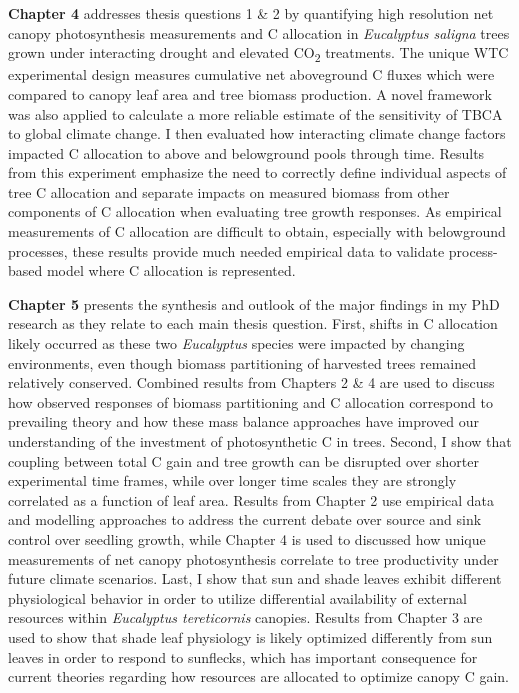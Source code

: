 \documentclass[a4paper]{article}\usepackage[]{graphicx}\usepackage[]{color}
\begin{document}
\textbf{Chapter 4} addresses thesis questions 1 \& 2 by quantifying high resolution net canopy photosynthesis measurements and C allocation in \textit{Eucalyptus saligna} trees grown under interacting drought and elevated CO\textsubscript{2} treatments. The unique WTC experimental design measures cumulative net aboveground C fluxes which were compared to canopy leaf area and tree biomass production. A novel framework was also applied to calculate a more reliable estimate of the sensitivity of TBCA to global climate change. I then evaluated how interacting climate change factors impacted C allocation to above and belowground pools through time. Results from this experiment emphasize the need to correctly define individual aspects of tree C allocation and separate impacts on measured biomass from other components of C allocation when evaluating tree growth responses. As empirical measurements of C allocation are difficult to obtain, especially with belowground processes, these results provide much needed empirical data to validate process-based model where C allocation is represented. 

\textbf{Chapter 5} presents the synthesis and outlook of the major findings in my PhD research as they relate to each main thesis question. First, shifts in C allocation likely occurred as these two \textit{Eucalyptus} species were impacted by changing environments, even though biomass partitioning of harvested trees remained relatively conserved. Combined results from Chapters 2 \& 4 are used to discuss how observed responses of biomass partitioning and C allocation correspond to prevailing theory and how these mass balance approaches have improved our understanding of the investment of photosynthetic C in trees. Second, I show that coupling between total C gain and tree growth can be disrupted over shorter experimental time frames, while over longer time scales they are strongly correlated as a function of leaf area. Results from Chapter 2 use empirical data and modelling approaches to address the current debate over source and sink control over seedling growth, while Chapter 4 is used to discussed how unique measurements of net canopy photosynthesis correlate to tree productivity under future climate scenarios. Last, I show that sun and shade leaves exhibit different physiological behavior in order to utilize differential availability of external resources within \textit{Eucalyptus tereticornis} canopies. Results from Chapter 3 are used to show that shade leaf physiology is likely optimized differently from sun leaves in order to respond to sunflecks, which has important consequence for current theories regarding how resources are allocated to optimize canopy C gain.
\end{document}
